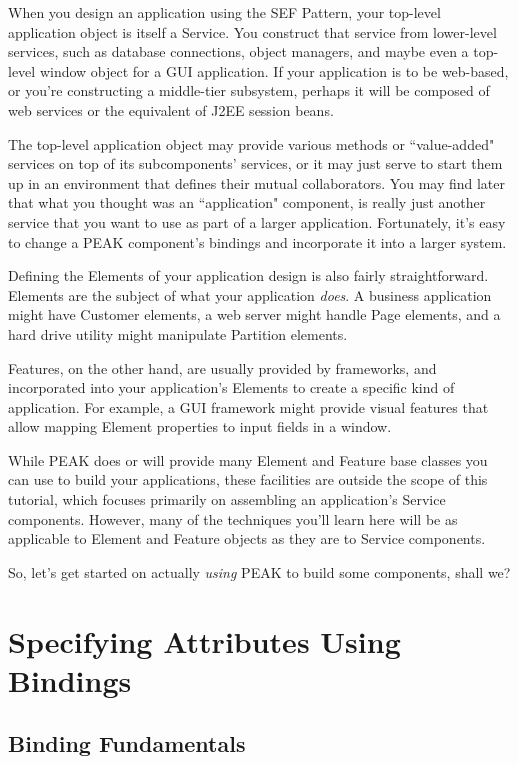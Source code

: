 When you design an application using the SEF Pattern, your top-level 
application object is itself a Service.  You construct that service from
lower-level services, such as database connections, object managers,
and maybe even a top-level window object for a GUI application.  If your
application is to be web-based, or you're constructing a middle-tier
subsystem, perhaps it will be composed of web services or the equivalent
of J2EE session beans.

The top-level application object may provide various methods or ``value-added"
services on top of its subcomponents' services, or it may just serve to start
them up in an environment that defines their mutual collaborators.  You may
find later that what you thought was an ``application" component, is really 
just another service that you want to use as part of a larger application.
Fortunately, it's easy to change a PEAK component's bindings and
incorporate it into a larger system.

Defining the Elements of your application design is also fairly
straightforward.  Elements are the subject of what your application
\emph{does}.  A business application might have Customer elements, a web
server might handle Page elements, and a hard drive utility might manipulate
Partition elements.

Features, on the other hand, are usually provided by frameworks, and
incorporated into your application's Elements to create a specific kind of
application.  For example, a GUI framework might provide visual features that
allow mapping Element properties to input fields in a window.

While PEAK does or will provide many Element and Feature base classes you can
use to build your applications, these facilities are outside the scope of
this tutorial, which focuses primarily on assembling an application's Service
components.  However, many of the techniques you'll learn here will be as
applicable to Element and Feature objects as they are to Service components.

So, let's get started on actually \emph{using} PEAK to build some
components, shall we?






\section{Specifying Attributes Using Bindings}

\subsection{Binding Fundamentals}

